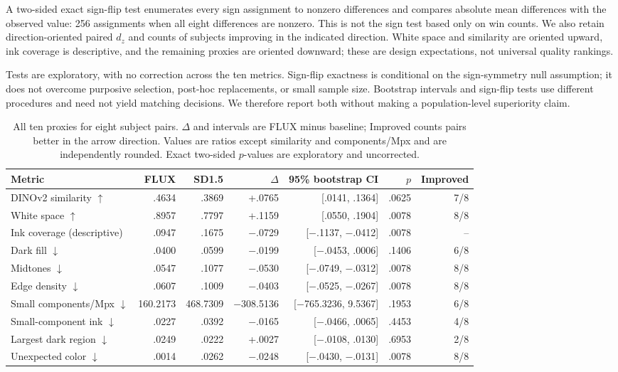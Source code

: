 \documentclass[11pt]{article}
\begin{document}
A two-sided exact sign-flip test enumerates every sign assignment to nonzero differences and compares absolute mean differences with the observed value: 256 assignments when all eight differences are nonzero. This is not the sign test based only on win counts. We also retain direction-oriented paired $d_z$ and counts of subjects improving in the indicated direction. White space and similarity are oriented upward, ink coverage is descriptive, and the remaining proxies are oriented downward; these are design expectations, not universal quality rankings.

Tests are exploratory, with no correction across the ten metrics. Sign-flip exactness is conditional on the sign-symmetry null assumption; it does not overcome purposive selection, post-hoc replacements, or small sample size. Bootstrap intervals and sign-flip tests use different procedures and need not yield matching decisions. We therefore report both without making a population-level superiority claim.

\begin{table}[t]
\centering
\small
\begin{tabular}{@{}lrrrrrr@{}}
\hline
Metric & FLUX & SD1.5 & $\Delta$ & 95\% bootstrap CI & $p$ & Improved \\
\hline
DINOv2 similarity $\uparrow$ & .4634 & .3869 & +.0765 & [.0141, .1364] & .0625 & 7/8 \\
White space $\uparrow$ & .8957 & .7797 & +.1159 & [.0550, .1904] & .0078 & 8/8 \\
Ink coverage (descriptive) & .0947 & .1675 & $-$.0729 & [$-$.1137, $-$.0412] & .0078 & -- \\
Dark fill $\downarrow$ & .0400 & .0599 & $-$.0199 & [$-$.0453, .0006] & .1406 & 6/8 \\
Midtones $\downarrow$ & .0547 & .1077 & $-$.0530 & [$-$.0749, $-$.0312] & .0078 & 8/8 \\
Edge density $\downarrow$ & .0607 & .1009 & $-$.0403 & [$-$.0525, $-$.0267] & .0078 & 8/8 \\
Small components/Mpx $\downarrow$ & 160.2173 & 468.7309 & $-$308.5136 & [$-$765.3236, 9.5367] & .1953 & 6/8 \\
Small-component ink $\downarrow$ & .0227 & .0392 & $-$.0165 & [$-$.0466, .0065] & .4453 & 4/8 \\
Largest dark region $\downarrow$ & .0249 & .0222 & +.0027 & [$-$.0108, .0130] & .6953 & 2/8 \\
Unexpected color $\downarrow$ & .0014 & .0262 & $-$.0248 & [$-$.0430, $-$.0131] & .0078 & 8/8 \\
\hline
\end{tabular}
\caption{All ten proxies for eight subject pairs. $\Delta$ and intervals are FLUX minus baseline; Improved counts pairs better in the arrow direction. Values are ratios except similarity and components/Mpx and are independently rounded. Exact two-sided $p$-values are exploratory and uncorrected.}
\label{tab:image-results}
\end{table}
\end{document}
